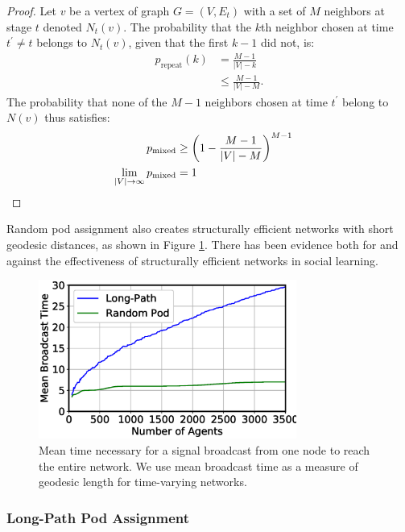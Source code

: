 \begin{proof}
Let $v$ be a vertex of graph $G=(V,E_t)$ with a set of $M$ neighbors at stage $t$ denoted $N_t(v)$.
The probability that the $k$th neighbor chosen at time $t^\prime \neq t$ belongs to $N_t(v)$, given that the first $k - 1$ did not, is:
\begin{align*}
p_\text{repeat}(k)
&= \frac{M - 1}{|V| - k} \\
&\leq \frac{M - 1}{|V| - M}.
\end{align*}
The probability that none of the $M-1$ neighbors chosen at time $t^\prime$ belong to $N(v)$ thus satisfies:
\begin{align*}
p_\text{mixed}
&\geq
\left( 1 - \frac{M - 1}{|V| - M} \right)^{M-1} \\
\lim_{|V|\rightarrow\infty} p_\text{mixed}
&= 1
&\qedhere
\end{align*}
\end{proof}

Random pod assignment also creates structurally efficient networks with short geodesic distances, as shown in Figure \ref{fig:broadcast}.
There has been evidence both for
\cite{lazer_network_2007, derex_partial_2016, mason_propagation_2008, barkoczi_social_2016}
and against
\cite{mason_collaborative_2012, barkoczi_social_2016}
the effectiveness of structurally efficient networks in social learning.

\begin{figure}
    \centering
    \includegraphics[width=3.33in]{fig/NetDelibABM/fig-broadcast.eps}
    \caption{Mean time necessary for a signal broadcast from one node to reach the entire network. We use mean broadcast time as a measure of geodesic length for time-varying networks.}
    \label{fig:broadcast}
\end{figure}


\subsubsection{Long-Path Pod Assignment}

